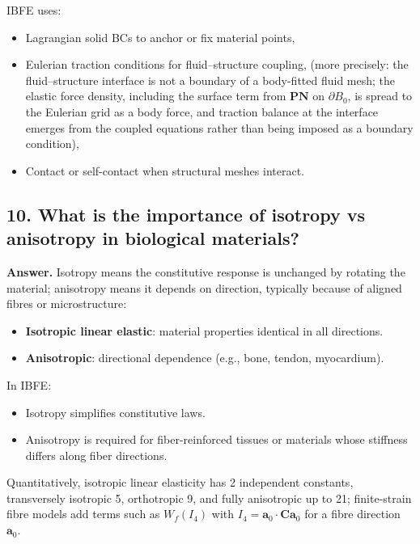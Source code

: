 \documentclass[12pt]{article}
\begin{document}
IBFE uses:
\begin{itemize}
    \item Lagrangian solid BCs to anchor or fix material points,
    \item Eulerian traction conditions for fluid–structure coupling,
    (more precisely: the fluid--structure interface is not a boundary of a body-fitted fluid mesh; the elastic force density, including the surface term from $\mathbf P\mathbf N$ on $\partial B_0$, is spread to the Eulerian grid as a body force, and traction balance at the interface emerges from the coupled equations rather than being imposed as a boundary condition),
    \item Contact or self-contact when structural meshes interact.
\end{itemize}


\subsection*{10. What is the importance of isotropy vs anisotropy in biological materials?}

\textbf{Answer.}
Isotropy means the constitutive response is unchanged by rotating the material; anisotropy means it depends on direction, typically because of aligned fibres or microstructure:

\begin{itemize}
    \item \textbf{Isotropic linear elastic}: material properties identical in all directions.
    \item \textbf{Anisotropic}: directional dependence (e.g., bone, tendon, myocardium).
\end{itemize}

In IBFE:
\begin{itemize}
    \item Isotropy simplifies constitutive laws.
    \item Anisotropy is required for fiber-reinforced tissues or materials whose stiffness differs along fiber directions.
\end{itemize}
Quantitatively, isotropic linear elasticity has 2 independent constants, transversely isotropic 5, orthotropic 9, and fully anisotropic up to 21; finite-strain fibre models add terms such as $W_f(I_4)$ with $I_4=\mathbf a_0\cdot\mathbf C\mathbf a_0$ for a fibre direction $\mathbf a_0$.



\end{document}
